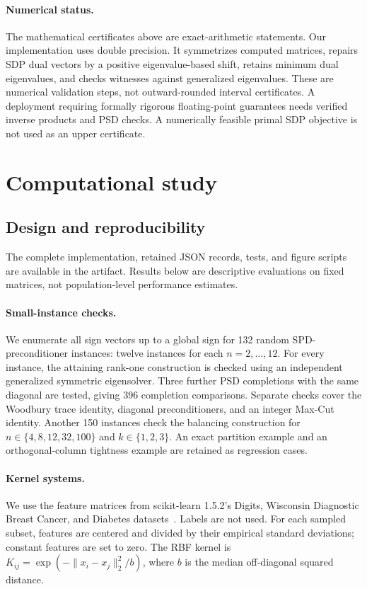 \documentclass[11pt]{article}
\theoremstyle{definition}\newtheorem{definition}[theorem]{Definition}
\begin{document}
\paragraph{Numerical status.}
The mathematical certificates above are exact-arithmetic statements. Our implementation uses double precision. It symmetrizes computed matrices, repairs SDP dual vectors by a positive eigenvalue-based shift, retains minimum dual eigenvalues, and checks witnesses against generalized eigenvalues. These are numerical validation steps, not outward-rounded interval certificates. A deployment requiring formally rigorous floating-point guarantees needs verified inverse products and PSD checks. A numerically feasible primal SDP objective is not used as an upper certificate.

\section{Computational study}
\subsection{Design and reproducibility}
The complete implementation, retained JSON records, tests, and figure scripts are available in the artifact. Results below are descriptive evaluations on fixed matrices, not population-level performance estimates.

\paragraph{Small-instance checks.}
We enumerate all sign vectors up to a global sign for 132 random SPD-preconditioner instances: twelve instances for each $n=2,\ldots,12$. For every instance, the attaining rank-one construction is checked using an independent generalized symmetric eigensolver. Three further PSD completions with the same diagonal are tested, giving 396 completion comparisons. Separate checks cover the Woodbury trace identity, diagonal preconditioners, and an integer Max-Cut identity. Another 150 instances check the balancing construction for $n\in\{4,8,12,32,100\}$ and $k\in\{1,2,3\}$. An exact partition example and an orthogonal-column tightness example are retained as regression cases.

\paragraph{Kernel systems.}
We use the feature matrices from scikit-learn 1.5.2's Digits, Wisconsin Diagnostic Breast Cancer, and Diabetes datasets~\cite{sklearn,street,efron}. Labels are not used. For each sampled subset, features are centered and divided by their empirical standard deviations; constant features are set to zero. The RBF kernel is
$K_{ij}=\exp(-\|x_i-x_j\|_2^2/b)$, where $b$ is the median off-diagonal squared distance.
\end{document}
